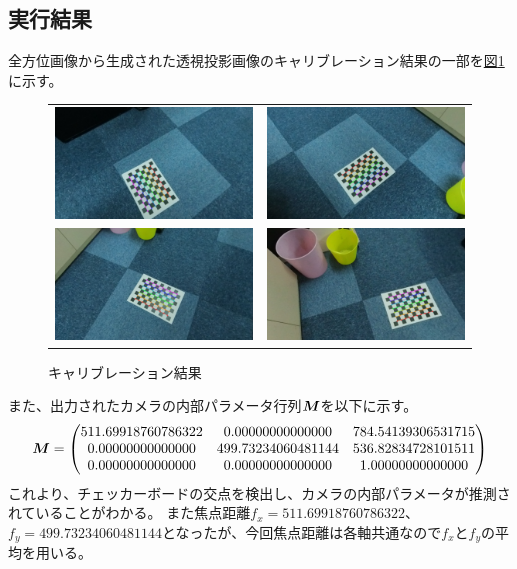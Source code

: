 \documentclass[]{jarticle}          %
\begin{document}
\subsection{実行結果}
全方位画像から生成された透視投影画像のキャリブレーション結果の一部を\hyperref[three]{図\ref{three}}に示す。
\begin{figure}[!ht]
  \begin{center}
    \begin{tabular}{cc}
      \includegraphics[keepaspectratio, width=0.4\linewidth]{figures/GetParam_result/1.jpg}&
      \includegraphics[keepaspectratio, width=0.4\linewidth]{figures/GetParam_result/5.jpg}\\
      \includegraphics[keepaspectratio, width=0.4\linewidth]{figures/GetParam_result/9.jpg}&
      \includegraphics[keepaspectratio, width=0.4\linewidth]{figures/GetParam_result/13.jpg}\\
    \end{tabular}
  \end{center}
  \caption{キャリブレーション結果}
  \label{three}
\end{figure}
また、出力されたカメラの内部パラメータ行列$\mbox{\boldmath $M$}$を以下に示す。
\begin{equation}
  \mbox{\boldmath $M$} = 
  \begin{pmatrix}
    511.69918760786322 & 0.00000000000000 & 784.54139306531715 \\
    0.00000000000000 & 499.73234060481144 & 536.82834728101511 \\
    0.00000000000000 & 0.00000000000000 & 1.00000000000000 \\
  \end{pmatrix}
\end{equation}
これより、チェッカーボードの交点を検出し、カメラの内部パラメータが推測されていることがわかる。
また焦点距離$f_x=511.69918760786322$、$f_y=499.73234060481144$となったが、今回焦点距離は各軸共通なので$f_x$と$f_y$の平均を用いる。
\end{document}
